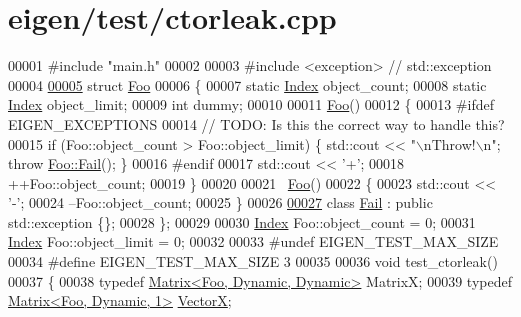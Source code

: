 \hypertarget{eigen_2test_2ctorleak_8cpp_source}{}\section{eigen/test/ctorleak.cpp}
\label{eigen_2test_2ctorleak_8cpp_source}

\begin{DoxyCode}
00001 \textcolor{preprocessor}{#include "main.h"}
00002 
00003 \textcolor{preprocessor}{#include <exception>}  \textcolor{comment}{// std::exception}
00004 
\hyperlink{struct_foo}{00005} \textcolor{keyword}{struct }\hyperlink{struct_foo}{Foo}
00006 \{
00007   \textcolor{keyword}{static} \hyperlink{namespace_eigen_a62e77e0933482dafde8fe197d9a2cfde}{Index} object\_count;
00008   \textcolor{keyword}{static} \hyperlink{namespace_eigen_a62e77e0933482dafde8fe197d9a2cfde}{Index} object\_limit;
00009   \textcolor{keywordtype}{int} dummy;
00010 
00011   \hyperlink{struct_foo}{Foo}()
00012   \{
00013 \textcolor{preprocessor}{#ifdef EIGEN\_EXCEPTIONS}
00014     \textcolor{comment}{// TODO: Is this the correct way to handle this?}
00015     \textcolor{keywordflow}{if} (Foo::object\_count > Foo::object\_limit) \{ std::cout << \textcolor{stringliteral}{"\(\backslash\)nThrow!\(\backslash\)n"}; \textcolor{keywordflow}{throw} 
      \hyperlink{class_foo_1_1_fail}{Foo::Fail}(); \}
00016 \textcolor{preprocessor}{#endif}
00017       std::cout << \textcolor{charliteral}{'+'};
00018     ++Foo::object\_count;
00019   \}
00020 
00021   ~\hyperlink{struct_foo}{Foo}()
00022   \{
00023       std::cout << \textcolor{charliteral}{'-'};
00024     --Foo::object\_count;
00025   \}
00026 
\hyperlink{class_foo_1_1_fail}{00027}   \textcolor{keyword}{class }\hyperlink{class_foo_1_1_fail}{Fail} : \textcolor{keyword}{public} std::exception \{\};
00028 \};
00029 
00030 \hyperlink{namespace_eigen_a62e77e0933482dafde8fe197d9a2cfde}{Index} Foo::object\_count = 0;
00031 \hyperlink{namespace_eigen_a62e77e0933482dafde8fe197d9a2cfde}{Index} Foo::object\_limit = 0;
00032 
00033 \textcolor{preprocessor}{#undef EIGEN\_TEST\_MAX\_SIZE}
00034 \textcolor{preprocessor}{#define EIGEN\_TEST\_MAX\_SIZE 3}
00035 
00036 \textcolor{keywordtype}{void} test\_ctorleak()
00037 \{
00038   \textcolor{keyword}{typedef} \hyperlink{group___core___module_class_eigen_1_1_matrix}{Matrix<Foo, Dynamic, Dynamic>} MatrixX;
00039   \textcolor{keyword}{typedef} \hyperlink{group___core___module_class_eigen_1_1_matrix}{Matrix<Foo, Dynamic, 1>} \hyperlink{group___core___module}{VectorX};

\end{DoxyCode}
